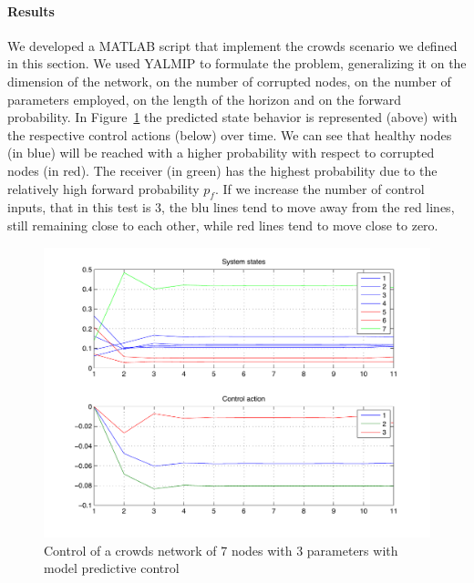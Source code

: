 \documentclass[a4paper, 11pt]{article}
\theoremstyle{definition}
\theoremstyle{remark}
\begin{document}
\paragraph{Results} %
\label{par:results}

We developed a MATLAB script that implement the crowds scenario we defined in this section. We used YALMIP to formulate the problem, generalizing it on the dimension of the network, on the number of corrupted nodes, on the number of parameters employed, on the length of the horizon and on the forward probability. In Figure~\ref{fig:results1} the predicted state behavior is represented (above) with the respective control actions (below) over time. We can see that healthy nodes (in blue) will be reached with a higher probability with respect to corrupted nodes (in red). The receiver (in green) has the highest probability due to the relatively high forward probability $p_f$. If we increase the number of control inputs, that in this test is $3$, the blu lines tend to move away from the red lines, still remaining close to each other, while red lines tend to move close to zero.

\begin{figure}[htbp]
	\begin{center}
	\includegraphics[width=.8\textwidth]{images/mpc}
	\end{center}
	\caption{Control of a crowds network of 7 nodes with 3 parameters with model predictive control}
	\label{fig:results1}
\end{figure}
\end{document}
